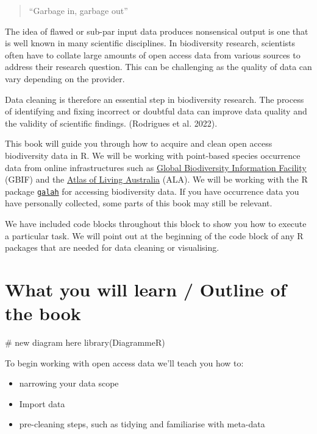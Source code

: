 \documentclass[
  letterpaper,
  DIV=11,
  numbers=noendperiod,
  oneside]{scrreprt}
\newenvironment{Shaded}{\begin{snugshade}}{\end{snugshade}}
\newcommand{\CommentTok}[1]{\textcolor[rgb]{0.37,0.37,0.37}{#1}}
\newcommand{\FunctionTok}[1]{\textcolor[rgb]{0.28,0.35,0.67}{#1}}
\newcommand{\NormalTok}[1]{\textcolor[rgb]{0.00,0.23,0.31}{#1}}
\begin{document}
\begin{quote}
``Garbage in, garbage out''
\end{quote}

The idea of flawed or sub-par input data produces nonsensical output is
one that is well known in many scientific disciplines. In biodiversity
research, scientists often have to collate large amounts of open access
data from various sources to address their research question. This can
be challenging as the quality of data can vary depending on the
provider.

Data cleaning is therefore an essential step in biodiversity research.
The process of identifying and fixing incorrect or doubtful data can
improve data quality and the validity of scientific findings. (Rodrigues
et al. 2022).

This book will guide you through how to acquire and clean open access
biodiversity data in R. We will be working with point-based species
occurrence data from online infrastructures such as
\href{https://www.gbif.org/}{Global Biodiversity Information Facility}
(GBIF) and the \href{https://www.ala.org.au/}{Atlas of Living Australia}
(ALA). We will be working with the R package
\href{https://galah.ala.org.au/}{\texttt{galah}} for accessing
biodiversity data. If you have occurrence data you have personally
collected, some parts of this book may still be relevant.

We have included code blocks throughout this block to show you how to
execute a particular task. We will point out at the beginning of the
code block of any R packages that are needed for data cleaning or
visualising.

\hypertarget{what-you-will-learn-outline-of-the-book}{%
\section{What you will learn / Outline of the
book}\label{what-you-will-learn-outline-of-the-book}}

\begin{Shaded}
\begin{Highlighting}[]
\CommentTok{\# new diagram here}
\FunctionTok{library}\NormalTok{(DiagrammeR)}
\end{Highlighting}
\end{Shaded}

To begin working with open access data we'll teach you how to:

\begin{itemize}
\item
  narrowing your data scope
\item
  Import data
\item
  pre-cleaning steps, such as tidying and familiarise with meta-data
\end{itemize}
\end{document}
